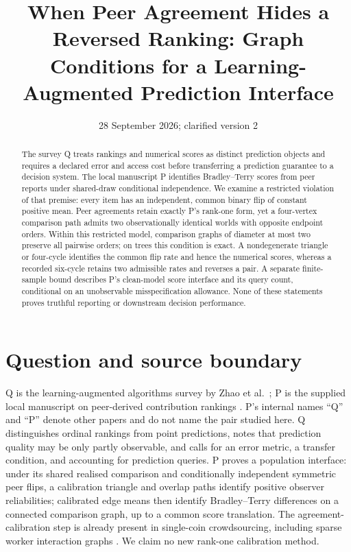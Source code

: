 \documentclass{article}
\title{When Peer Agreement Hides a Reversed Ranking: Graph Conditions for a Learning-Augmented Prediction Interface}
\date{28 September 2026; clarified version 2}
\begin{document}
\maketitle

\begin{abstract}
The survey Q treats rankings and numerical scores as distinct prediction objects and requires a
declared error and access cost before transferring a prediction guarantee to a decision system. The
local manuscript P identifies Bradley--Terry scores from peer reports under shared-draw conditional
independence. %
We examine a restricted violation of that premise: every item has an independent, common binary flip
of constant positive mean. Peer agreements retain exactly P's rank-one form, yet a four-vertex
comparison path admits two observationally identical worlds with opposite endpoint orders. %
Within this restricted model, comparison graphs of diameter at most two preserve all pairwise
orders; on trees this condition is exact. A nondegenerate triangle or four-cycle identifies the
common flip rate and hence the numerical scores, whereas a recorded six-cycle retains two admissible
rates and reverses a pair. %
A separate finite-sample bound describes P's clean-model score interface and its query count,
conditional on an unobservable misspecification allowance. None of these statements proves truthful
reporting or downstream decision performance. %
\end{abstract}

\section{Question and source boundary}
Q is the learning-augmented algorithms survey by Zhao et al.\ \cite{Q}; P is the supplied local
manuscript on peer-derived contribution rankings \cite{P}. P's internal names ``Q'' and ``P'' denote
other papers and do not name the pair studied here. %
Q distinguishes ordinal rankings from point predictions, notes that prediction quality may be only
partly observable, and calls for an error metric, a transfer condition, and accounting for
prediction queries. %
P proves a population interface: under its shared realised comparison and conditionally independent
symmetric peer flips, a calibration triangle and overlap paths identify positive observer
reliabilities; calibrated edge means then identify Bradley--Terry differences on a connected
comparison graph, up to a common score translation. %
The agreement-calibration step is already present in single-coin crowdsourcing, including sparse
worker interaction graphs \cite{Ma2017}. We claim no new rank-one calibration method. %
\end{document}
